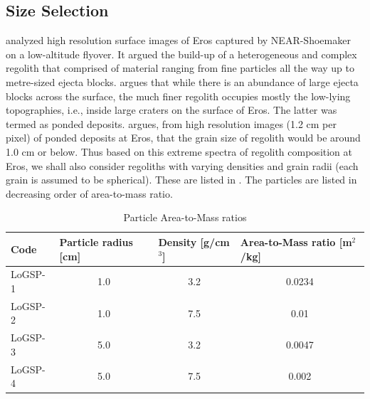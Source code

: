 \subsection{Size Selection}
\label{subsec:regolith_size_selection}
\cite{Veverka2001} analyzed high resolution surface images of Eros captured by \gls{NEAR}-Shoemaker on a low-altitude flyover. It argued the build-up of a heterogeneous and complex regolith that comprised of material ranging from fine particles all the way up to metre-sized ejecta blocks. \cite{Veverka2001} argues that while there is an abundance of large ejecta blocks across the surface, the much finer regolith occupies mostly the low-lying topographies, i.e., inside large craters on the surface of Eros. The latter was termed as ponded deposits. \cite{Robinson2001} argues, from high resolution images (1.2 cm per pixel) of ponded deposits at Eros, that the grain size of regolith would be around 1.0 cm or below.
%
\newline\newline
%
Thus based on this extreme spectra of regolith composition at Eros, we shall also consider regoliths with varying densities and grain radii (each grain is assumed to be spherical). These are listed in . The particles are listed in decreasing order of area-to-mass ratio.
\begin{table}[htb]
\centering
\captionsetup{justification=centering}
\caption{Particle Area-to-Mass ratios}
\label{tab:area_to_mass_ratio}
\begin{tabular}{|l|c|c|c|}
\hline
Code    & \multicolumn{1}{l|}{Particle radius {[}cm{]}} & \multicolumn{1}{l|}{Density {[}g/cm$^3${]}} & \multicolumn{1}{l|}{Area-to-Mass ratio {[}m$^2$/kg{]}} \\ \hline
LoGSP-1     &   1.0     &   3.2     & 0.0234        \\ \hline
LoGSP-2     &   1.0     &   7.5     & 0.01          \\ \hline
LoGSP-3     &   5.0     &   3.2     & 0.0047        \\ \hline
LoGSP-4     &   5.0     &   7.5     & 0.002         \\ \hline
\end{tabular}
\end{table}
\FloatBarrier

